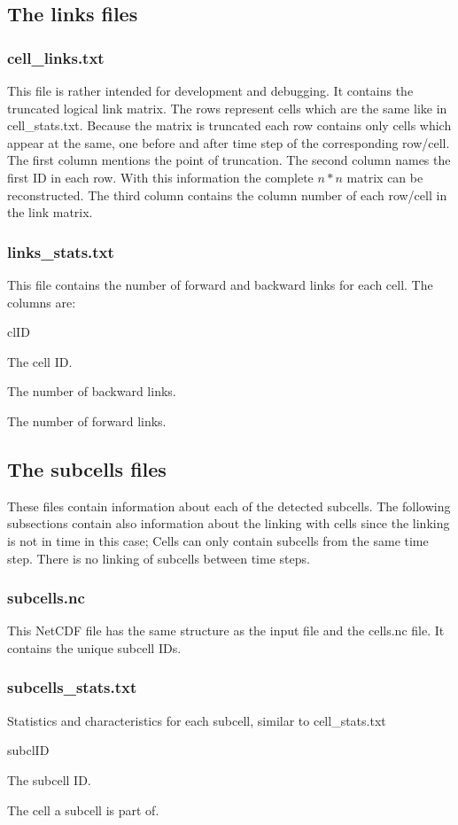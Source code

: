 \documentclass{scrartcl}
\begin{document}
\subsection{The links files}
\subsubsection{cell\_links.txt}
This file is rather intended for development and debugging. It contains the truncated logical link matrix. The rows represent cells which are the same like in cell\_stats.txt. Because the matrix is truncated each row contains only cells which appear at the same, one before and after time step of the corresponding row/cell. The first column mentions the point of truncation. The second column names the first ID in each row. With this information the complete $n*n$ matrix can be reconstructed. The third column contains the column number of each row/cell in the link matrix.

\subsubsection{links\_stats.txt}
This file contains the number of forward and backward links for each cell. The columns are:
\begin{labeling}{clID}
	\item[clID] The cell ID.
	\item[nbw] The number of backward links.
	\item[nfw] The number of forward links.

\end{labeling}

\subsection{The subcells files}
These files contain information about each of the detected subcells. The following subsections contain also information about the linking with cells since the linking is not in time in this case; Cells can only contain subcells from the same time step. There is no linking of subcells between time steps.

\subsubsection{subcells.nc}
This NetCDF file has the same structure as the input file and the cells.nc file. It contains the unique subcell IDs.

\subsubsection{subcells\_stats.txt}
Statistics and characteristics for each subcell, similar to cell\_stats.txt
\begin{labeling}{subclID}
    \item[subclID] The subcell ID.
    \item[clID] The cell a subcell is part of.
    
\end{labeling}
\end{document}
